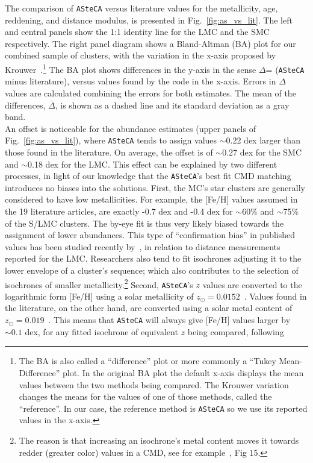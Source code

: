 \documentclass[draft]{aa}
\begin{document}
The comparison of \texttt{ASteCA} versus literature values for the metallicity,
age, reddening, and distance modulus, is presented in
Fig.~\ref{fig:as_vs_lit}. The left and central panels show the 1:1 identity line
for the LMC and the SMC respectively.
%
The right panel diagram shows a Bland-Altman (BA) plot for our combined sample
of clusters, with the variation in the x-axis proposed by
Krouwer~\citep{Bland_1986,Krouwer_2008}.\footnote{The BA is
also called a ``difference'' plot or more commonly a ``Tukey Mean-Difference''
plot. In the original BA plot the default x-axis displays the mean values
between the two methods being compared. The Krouwer variation changes the means
for the values of one of those methods, called the ``reference''. In our case,
the reference method is \texttt{ASteCA} so we use its reported values in the
x-axis.}
%
The BA plot shows differences in the y-axis in the sense $\Delta$= (\texttt
{ASteCA} minus literature), versus values found by the code in the x-axis. Errors
in $\Delta$ values are calculated combining the errors for both estimates. The
mean of the differences, $\overline{\Delta}$, is shown as a dashed line and its
standard deviation as a gray band.\\

An offset is noticeable for the abundance estimates (upper panels of
Fig.~\ref{fig:as_vs_lit}), where \texttt{ASteCA} tends to assign values
$\sim$0.22 dex larger than those found in the literature.
On average, the offset is of $\sim$0.27 dex for the SMC and $\sim$0.18 dex for
the LMC.\@
%
This effect can be explained by two different processes, in light of our
knowledge that the \texttt{ASteCA}'s best fit CMD matching introduces no
biases into the solutions.
%
First, the MC's star clusters are generally considered to have low
metallicities. For example, the [Fe/H] values assumed in the 19
literature articles, are exactly -0.7 dex and -0.4 dex for $\sim$60\% and
$\sim$75\% of the S/LMC clusters. The by-eye fit is thus very likely biased
towards the assignment of lower abundances. This type of ``confirmation
bias'' in published values has been studied recently by~\cite{de_Grijs_2014}, in
relation to distance measurements reported for the LMC.\@
Researchers also tend to fit isochrones adjusting it to the lower envelope of a
cluster's sequence; which also contributes to the selection of isochrones of
smaller metallicity.\footnote{The reason is that increasing an isochrone's metal
content moves it towards redder (greater color) values in a CMD, see for
example~\cite{Bressan_2012}, Fig 15.}
%
Second, \texttt{ASteCA}'s $z$ values are converted to the logarithmic form 
[Fe/H]
using a solar metallicity of $z_{\odot}{=}0.0152$~\citep{Bressan_2012}.
Values found in the literature, on the other hand, are converted using a solar
metal content of $z_{\odot}{=}0.019$~\citep{Marigo_2008}. This means that
\texttt{ASteCA} will always give [Fe/H] values larger by ${\sim}0.1$ dex, for
any fitted isochrone of equivalent $z$ being compared, following
\end{document}
